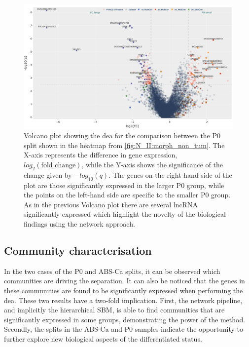 \begin{figure}    
    \centering
    \includegraphics[width=1.0\textwidth,height=1.0\textheight,keepaspectratio]{Sections/Network_II/resources/non_tum/p0_split_dea.png}
    \caption[Volcano plot between the P0 splits]{Volcano plot showing the \acrlong{dea} for the comparison between the P0 split shown in the heatmap from \cref{fig:N_II:morph_non_tum}. The X-axis represents the difference in gene expression, $log_2(\text{fold\_change})$, while the Y-axis shows the significance of the change given by $-log_{10}(q)$. The genes on the right-hand side of the plot are those significantly expressed in the larger P0 group, while the points on the left-hand side are specific to the smaller P0 group. As in the previous Volcano plot there are several \acrshort{lncRNA} significantly expressed which highlight the novelty of the biological findings using the network approach.}
    \label{fig:N_II:p0_split}
\end{figure}

\subsection{Community characterisation} \label{s:N_II:comm_charact}

In the two cases of the P0 and ABS-Ca splits, it can be observed which communities are driving the separation. It can also be noticed that the genes in these communities are found to be significantly expressed when performing the \acrlong{dea}. These two results have a two-fold implication. First, the network pipeline, and implicitly the hierarchical SBM, is able to find communities that are significantly expressed in some groups, demonstrating the power of the method. Secondly, the splits in the ABS-Ca and P0 samples indicate the opportunity to further explore new biological aspects of the differentiated status.

